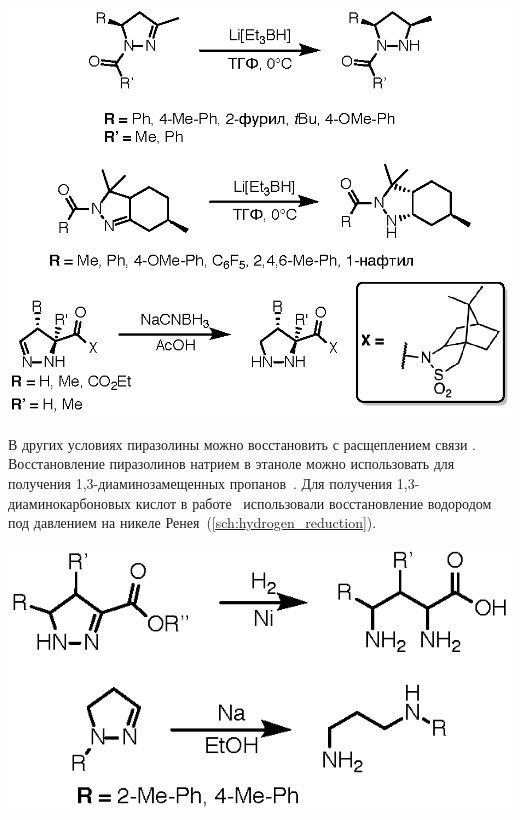 \begin{scheme}
    \centering
    \includegraphics{sections/literature/img/hydride_reduction.eps}
    \caption{}
    \label{sch:hydride_reduction}
\end{scheme}

В других условиях пиразолины можно восстановить с расщеплением связи .
Восстановление пиразолинов натрием в этаноле можно использовать для получения 1,3-диаминозамещенных пропанов~\cite{Chemistry1967}.
Для получения 1,3-диаминокарбоновых кислот в работе~\cite{Carter1949} использовали восстановление водородом под давлением на никеле Ренея~(\ref{sch:hydrogen_reduction}).

\begin{scheme}
    \centering
    \includegraphics{sections/literature/img/hydrogen_reduction.eps}
    \caption{}
    \label{sch:hydrogen_reduction}
\end{scheme}

